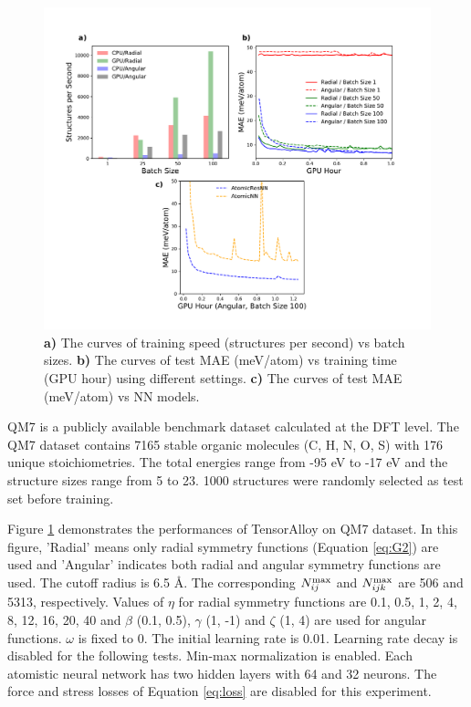 \documentclass[final,1p,times]{elsarticle}
\begin{document}
% 
%
\begin{figure}[h!]
\centering
\includegraphics[scale=0.44]{figures/qm7_speed.pdf}
\caption{\label{fig:benchmark_qm7} 
\textbf{a)} The curves of training speed (structures per second) vs batch sizes. 
\textbf{b)} The curves of test MAE (meV/atom) vs training time (GPU hour) using 
different settings.
\textbf{c)} The curves of test MAE (meV/atom) vs NN models. 
}
\end{figure}

QM7\cite{QM7_1,QM7_2} is a publicly available benchmark dataset calculated at 
the DFT level. The QM7 dataset contains 7165 stable organic molecules 
(C, H, N, O, S) with 176 unique stoichiometries. The total energies range from 
-95 eV to -17 eV and the structure sizes range from 5 to 23. 1000 structures 
were randomly selected as test set before training.

Figure \ref{fig:benchmark_qm7} demonstrates the performances of 
TensorAlloy on QM7 dataset. In this figure, 'Radial' means only radial 
symmetry functions (Equation \ref{eq:G2}) are used and 'Angular' indicates both 
radial and angular symmetry functions are used. The cutoff radius is 6.5 \AA.
The corresponding $N_{ij}^{\mathrm{max}}$ and $N_{ijk}^{\mathrm{max}}$ are 506 and 5313, respectively.
Values of $\eta$ for radial symmetry functions are 0.1, 0.5, 1, 2, 4, 8, 12, 16, 
20, 40 and $\beta$ (0.1, 0.5), $\gamma$ (1, -1) and $\zeta$ (1, 4) are used for
angular functions. $\omega$ is fixed to 0. The initial learning rate is 0.01. 
Learning rate decay is disabled for the following tests. Min-max normalization
is enabled. Each atomistic neural network has two hidden layers with 64 and 32 
neurons. The force and stress losses of Equation \ref{eq:loss} are disabled for 
this experiment.
\end{document}
